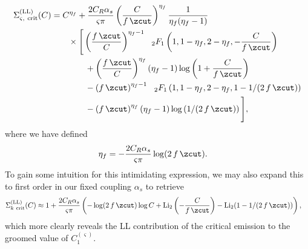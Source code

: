 \documentclass[letterpaper,11pt]{article}
\begin{document}
\begin{equation}
\begin{aligned}
    \Sigma^{\rm(LL)}_{\varsigma,~{\rm crit}} (C)
    &=
    C^{\eta_f}
    + \frac{2C_R\alpha_s}
    {\varsigma \pi}
    \left(
        \frac{C}{f\,\zcut}
    \right)
    ^{\eta_f}
    \frac{1}{\eta_f(\eta_f-1)}
    \\
    &~~~~~~
    \times
    \Bigg[
        \left(
        \frac{f\,\zcut}{C}
        \right)
        ^{\eta_f - 1}
        {}_{~~2}F_1
        \left(
            1, 1-\eta_f, 2-\eta_f,
            -\frac{C}{f\,\zcut}
        \right)
        \\
        &~~~~~~~~~~~~
        +
        \left(
        \frac{f\,\zcut}{C}
        \right)
        ^{\eta_f}
        \left(\eta_f-1\right)
        \log\left(
        1 + \frac{C} {f\,\zcut}
        \right)
        \\
        &~~~~~~~~~~~~
        -\left(f\,\zcut\right)
        ^{\eta_f - 1}
        {}_{~~2}F_1
        \left(
            1,1-\eta_f,2-\eta_f,
            1-1/(2\,f\,\zcut)
        \right)
        \\
        &~~~~~~~~~~~~
        -
        \left(f\,\zcut\right)
        ^{\eta_f}
        \left(\eta_f-1\right)
        \log\left(1/(2\,f\,\zcut)\right)
    \Bigg]
    ,
    \label{eqn:ECF_LL}
\end{aligned}
\end{equation}
%
where we have defined
\begin{align}
    \eta_f
    &=
    -\frac{2 C_R \alpha_s}{\varsigma \pi}
    \log(2\,f\,\zcut)
    .
\end{align}
%
To gain some intuition for this intimidating expression, we may also expand this to first order in our fixed coupling \(\alpha_s\) to retrieve
%
\begin{equation}
\begin{aligned}
    \Sigma^{\rm(LL)}_{k~{\rm crit}} (C)
    &\approx
    1 + \frac{2 C_R \alpha_s} {\varsigma \pi}
    \left(
        -\log(2\,f\,\zcut)
        \log C
        +
        {\rm Li}_2
        \left(
        -\frac{C}{f\,\zcut}
        \right)
        -
        {\rm Li}_2(1 - 1/(2\,f\,\zcut))
    \right)
    ,
    \label{eqn:convolDistExpansion}
\end{aligned}
\end{equation}
%
which more clearly reveals the LL contribution of the critical emission to the groomed value of \(C_1^{(\varsigma)}\).
\end{document}
